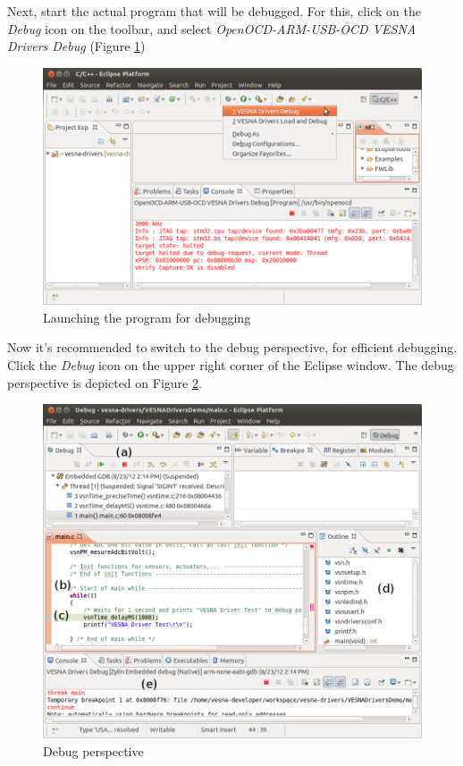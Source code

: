 \documentclass[a4paper, 10pt]{article}
\begin{document}
Next, start the actual program that will be debugged.
For this, click on the \emph{Debug} icon on the toolbar, and select
\emph{OpenOCD-ARM-USB-OCD VESNA Drivers Debug}
(Figure \ref{fig:debug-launch})

    \begin{figure}[H]
    \centering
        \includegraphics[width=\textwidth]{./install-guide-linux-images/debug-launch.png}
        \caption{Launching the program for debugging}
        \label{fig:debug-launch}
    \end{figure}

Now it's recommended to switch to the debug perspective,
for efficient debugging.
Click the \emph{Debug} icon on the upper right corner of the Eclipse window.
The debug perspective is depicted on Figure \ref{fig:debug-window}.


    \begin{figure}[H]
    \centering
        \includegraphics[width=\textwidth]{./install-guide-linux-images/debug-window.png}
        \caption{Debug perspective}
        \label{fig:debug-window}
    \end{figure}
\end{document}
